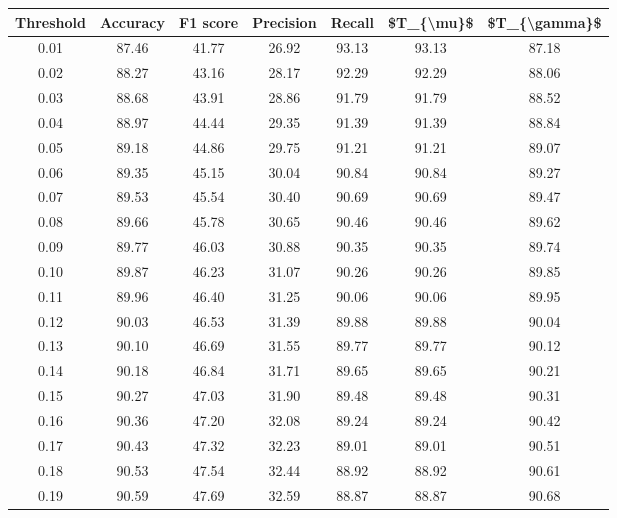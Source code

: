 \begin{tabular}{|c|c|c|c|c|c|c|}
\hline
 Threshold &  Accuracy &  F1 score &  Precision &  Recall &  \$T\_\{\textbackslash mu\}\$ &  \$T\_\{\textbackslash gamma\}\$ \\
\hline
      0.01 &     87.46 &     41.77 &      26.92 &   93.13 &      93.13 &         87.18 \\
      0.02 &     88.27 &     43.16 &      28.17 &   92.29 &      92.29 &         88.06 \\
      0.03 &     88.68 &     43.91 &      28.86 &   91.79 &      91.79 &         88.52 \\
      0.04 &     88.97 &     44.44 &      29.35 &   91.39 &      91.39 &         88.84 \\
      0.05 &     89.18 &     44.86 &      29.75 &   91.21 &      91.21 &         89.07 \\
      0.06 &     89.35 &     45.15 &      30.04 &   90.84 &      90.84 &         89.27 \\
      0.07 &     89.53 &     45.54 &      30.40 &   90.69 &      90.69 &         89.47 \\
      0.08 &     89.66 &     45.78 &      30.65 &   90.46 &      90.46 &         89.62 \\
      0.09 &     89.77 &     46.03 &      30.88 &   90.35 &      90.35 &         89.74 \\
      0.10 &     89.87 &     46.23 &      31.07 &   90.26 &      90.26 &         89.85 \\
      0.11 &     89.96 &     46.40 &      31.25 &   90.06 &      90.06 &         89.95 \\
      0.12 &     90.03 &     46.53 &      31.39 &   89.88 &      89.88 &         90.04 \\
      0.13 &     90.10 &     46.69 &      31.55 &   89.77 &      89.77 &         90.12 \\
      0.14 &     90.18 &     46.84 &      31.71 &   89.65 &      89.65 &         90.21 \\
      0.15 &     90.27 &     47.03 &      31.90 &   89.48 &      89.48 &         90.31 \\
      0.16 &     90.36 &     47.20 &      32.08 &   89.24 &      89.24 &         90.42 \\
      0.17 &     90.43 &     47.32 &      32.23 &   89.01 &      89.01 &         90.51 \\
      0.18 &     90.53 &     47.54 &      32.44 &   88.92 &      88.92 &         90.61 \\
      0.19 &     90.59 &     47.69 &      32.59 &   88.87 &      88.87 &         90.68 \\

\end{tabular}
